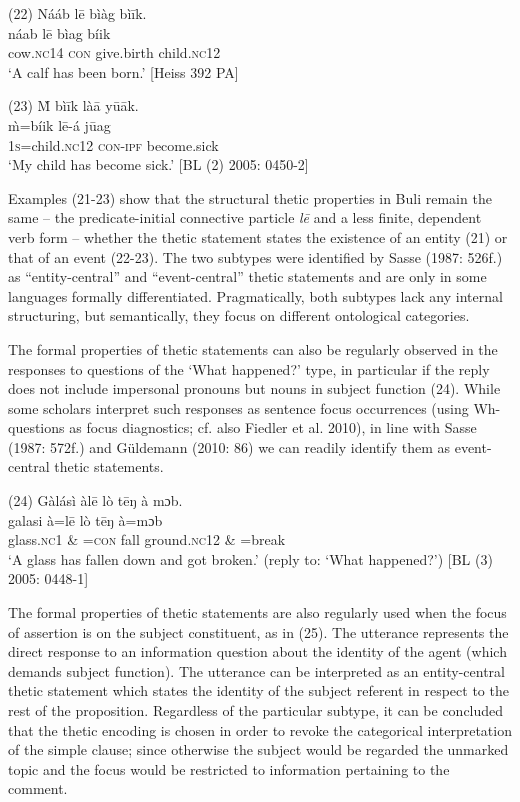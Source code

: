 \documentclass[output=paper]{langsci/langscibook}
\begin{document}
\gll \textup{(22)}  Nááb    l\={e}  bìàg    bì\={i}k.\\
\gll \textup{  náab    l\={e}  bìag    bíik}\\
       cow.\textsc{nc}14  \textsc{con}   give.birth  child.\textsc{nc}12\\
\glt ‘A calf has been born.’ [Heiss 392 PA]
\z

\gll \textup{(23)}  \`{M}  bì\={i}k      là\={a}    y\={u}\={a}k.\\
\gll \textup{  \`{m}=bíik      l\={e}-á    j\={u}ag}\\
       1\textsc{s}=child.\textsc{nc}12    \textsc{con}{}-\textsc{ipf}  become.sick\\
\glt ‘My child has become sick.’ [BL (2) 2005: 0450-2]
\z

Examples (21-23) show that the structural thetic properties in Buli remain the same – the predicate-initial connective particle \textit{l\={e} }and a less finite, dependent verb form – whether the thetic statement states the existence of an entity (21) or that of an event (22-23). The two subtypes were identified by Sasse (1987: 526f.) as “entity-central” and “event-central” thetic statements and are only in some languages formally differentiated. Pragmatically, both subtypes lack any internal structuring, but semantically, they focus on different ontological categories.

The formal properties of thetic statements can also be regularly observed in the responses to questions of the ‘What happened?’ type, in particular if the reply does not include impersonal pronouns but nouns in subject function (24). While some scholars interpret such responses as sentence focus occurrences (using Wh-questions as focus diagnostics; cf. also Fiedler et al. 2010), in line with Sasse (1987: 572f.) and Güldemann (2010: 86) we can readily identify them as event-central thetic statements. 

\gll \textup{(24)}  Gàlásì    àl\={e}    lò  t\={e}ŋ    à   mɔb.\\
\gll \textup{  galasi}\textup{     à=l\={e}    lò  t\={e}ŋ    à=mɔb}\\
       glass.\textsc{nc}1  \& =\textsc{con}  fall  ground.\textsc{nc}12  \& =break\\
\glt ‘A glass has fallen down and got broken.’ (reply to: ‘What happened?’) [BL (3) 2005: 0448-1]
\z

The formal properties of thetic statements are also regularly used when the focus of assertion is on the subject constituent, as in (25). The utterance represents the direct response to an information question about the identity of the agent (which demands subject function). The utterance can be interpreted as an entity-central thetic statement which states the identity of the subject referent in respect to the rest of the proposition. Regardless of the particular subtype, it can be concluded that the thetic encoding is chosen in order to revoke the categorical interpretation of the simple clause; since otherwise the subject would be regarded the unmarked topic and the focus would be restricted to information pertaining to the comment. 
\end{document}
